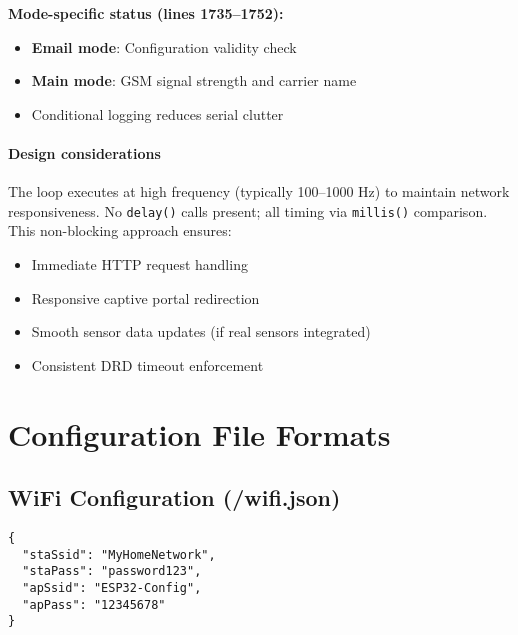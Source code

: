 \documentclass[11pt,a4paper]{article}
\begin{document}
\textbf{Mode-specific status (lines 1735--1752):}
\begin{itemize}[leftmargin=*]
  \item \textbf{Email mode}: Configuration validity check
  \item \textbf{Main mode}: GSM signal strength and carrier name
  \item Conditional logging reduces serial clutter
\end{itemize}

\paragraph{Design considerations}
The loop executes at high frequency (typically 100--1000 Hz) to maintain network responsiveness. No \texttt{delay()} calls present; all timing via \texttt{millis()} comparison. This non-blocking approach ensures:
\begin{itemize}[leftmargin=*]
  \item Immediate HTTP request handling
  \item Responsive captive portal redirection
  \item Smooth sensor data updates (if real sensors integrated)
  \item Consistent DRD timeout enforcement
\end{itemize}

\section{Configuration File Formats}

\subsection{WiFi Configuration (/wifi.json)}

\begin{verbatim}
{
  "staSsid": "MyHomeNetwork",
  "staPass": "password123",
  "apSsid": "ESP32-Config",
  "apPass": "12345678"
}
\end{verbatim}
\end{document}
